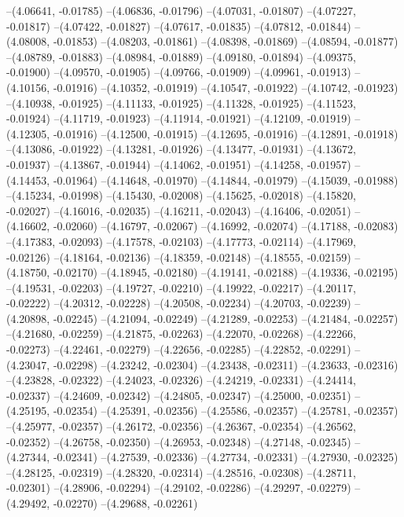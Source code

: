 --(4.06641, -0.01785)
--(4.06836, -0.01796)
--(4.07031, -0.01807)
--(4.07227, -0.01817)
--(4.07422, -0.01827)
--(4.07617, -0.01835)
--(4.07812, -0.01844)
--(4.08008, -0.01853)
--(4.08203, -0.01861)
--(4.08398, -0.01869)
--(4.08594, -0.01877)
--(4.08789, -0.01883)
--(4.08984, -0.01889)
--(4.09180, -0.01894)
--(4.09375, -0.01900)
--(4.09570, -0.01905)
--(4.09766, -0.01909)
--(4.09961, -0.01913)
--(4.10156, -0.01916)
--(4.10352, -0.01919)
--(4.10547, -0.01922)
--(4.10742, -0.01923)
--(4.10938, -0.01925)
--(4.11133, -0.01925)
--(4.11328, -0.01925)
--(4.11523, -0.01924)
--(4.11719, -0.01923)
--(4.11914, -0.01921)
--(4.12109, -0.01919)
--(4.12305, -0.01916)
--(4.12500, -0.01915)
--(4.12695, -0.01916)
--(4.12891, -0.01918)
--(4.13086, -0.01922)
--(4.13281, -0.01926)
--(4.13477, -0.01931)
--(4.13672, -0.01937)
--(4.13867, -0.01944)
--(4.14062, -0.01951)
--(4.14258, -0.01957)
--(4.14453, -0.01964)
--(4.14648, -0.01970)
--(4.14844, -0.01979)
--(4.15039, -0.01988)
--(4.15234, -0.01998)
--(4.15430, -0.02008)
--(4.15625, -0.02018)
--(4.15820, -0.02027)
--(4.16016, -0.02035)
--(4.16211, -0.02043)
--(4.16406, -0.02051)
--(4.16602, -0.02060)
--(4.16797, -0.02067)
--(4.16992, -0.02074)
--(4.17188, -0.02083)
--(4.17383, -0.02093)
--(4.17578, -0.02103)
--(4.17773, -0.02114)
--(4.17969, -0.02126)
--(4.18164, -0.02136)
--(4.18359, -0.02148)
--(4.18555, -0.02159)
--(4.18750, -0.02170)
--(4.18945, -0.02180)
--(4.19141, -0.02188)
--(4.19336, -0.02195)
--(4.19531, -0.02203)
--(4.19727, -0.02210)
--(4.19922, -0.02217)
--(4.20117, -0.02222)
--(4.20312, -0.02228)
--(4.20508, -0.02234)
--(4.20703, -0.02239)
--(4.20898, -0.02245)
--(4.21094, -0.02249)
--(4.21289, -0.02253)
--(4.21484, -0.02257)
--(4.21680, -0.02259)
--(4.21875, -0.02263)
--(4.22070, -0.02268)
--(4.22266, -0.02273)
--(4.22461, -0.02279)
--(4.22656, -0.02285)
--(4.22852, -0.02291)
--(4.23047, -0.02298)
--(4.23242, -0.02304)
--(4.23438, -0.02311)
--(4.23633, -0.02316)
--(4.23828, -0.02322)
--(4.24023, -0.02326)
--(4.24219, -0.02331)
--(4.24414, -0.02337)
--(4.24609, -0.02342)
--(4.24805, -0.02347)
--(4.25000, -0.02351)
--(4.25195, -0.02354)
--(4.25391, -0.02356)
--(4.25586, -0.02357)
--(4.25781, -0.02357)
--(4.25977, -0.02357)
--(4.26172, -0.02356)
--(4.26367, -0.02354)
--(4.26562, -0.02352)
--(4.26758, -0.02350)
--(4.26953, -0.02348)
--(4.27148, -0.02345)
--(4.27344, -0.02341)
--(4.27539, -0.02336)
--(4.27734, -0.02331)
--(4.27930, -0.02325)
--(4.28125, -0.02319)
--(4.28320, -0.02314)
--(4.28516, -0.02308)
--(4.28711, -0.02301)
--(4.28906, -0.02294)
--(4.29102, -0.02286)
--(4.29297, -0.02279)
--(4.29492, -0.02270)
--(4.29688, -0.02261)
